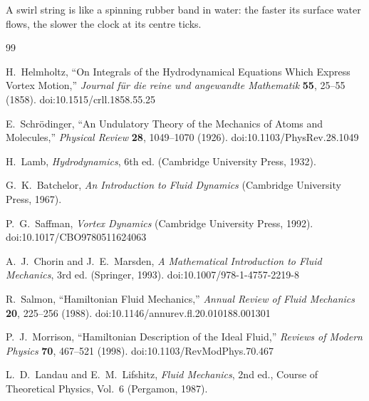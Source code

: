 \documentclass[11pt]{article}
\begin{document}
        A swirl string is like a spinning rubber band in water: the faster its surface water flows, the slower the clock at its centre ticks.


        


        \begin{thebibliography}{99}

            H.~Helmholtz,
            ``On Integrals of the Hydrodynamical Equations Which Express Vortex Motion,''
            \emph{Journal f\"ur die reine und angewandte Mathematik} \textbf{55}, 25--55 (1858).
            doi:10.1515/crll.1858.55.25

            E.~Schr\"odinger,
            ``An Undulatory Theory of the Mechanics of Atoms and Molecules,''
            \emph{Physical Review} \textbf{28}, 1049--1070 (1926).
            doi:10.1103/PhysRev.28.1049

            H.~Lamb,
            \emph{Hydrodynamics}, 6th ed.
            (Cambridge University Press, 1932).

            G.~K.~Batchelor,
            \emph{An Introduction to Fluid Dynamics}
            (Cambridge University Press, 1967).

            P.~G.~Saffman,
            \emph{Vortex Dynamics}
            (Cambridge University Press, 1992).
            doi:10.1017/CBO9780511624063

            A.~J.~Chorin and J.~E.~Marsden,
            \emph{A Mathematical Introduction to Fluid Mechanics}, 3rd ed.
            (Springer, 1993).
            doi:10.1007/978-1-4757-2219-8

            R.~Salmon,
            ``Hamiltonian Fluid Mechanics,''
            \emph{Annual Review of Fluid Mechanics} \textbf{20}, 225--256 (1988).
            doi:10.1146/annurev.fl.20.010188.001301

            P.~J.~Morrison,
            ``Hamiltonian Description of the Ideal Fluid,''
            \emph{Reviews of Modern Physics} \textbf{70}, 467--521 (1998).
            doi:10.1103/RevModPhys.70.467

            L.~D.~Landau and E.~M.~Lifshitz,
            \emph{Fluid Mechanics}, 2nd ed.,
            Course of Theoretical Physics, Vol.~6
            (Pergamon, 1987).


\end{thebibliography}
\end{document}
